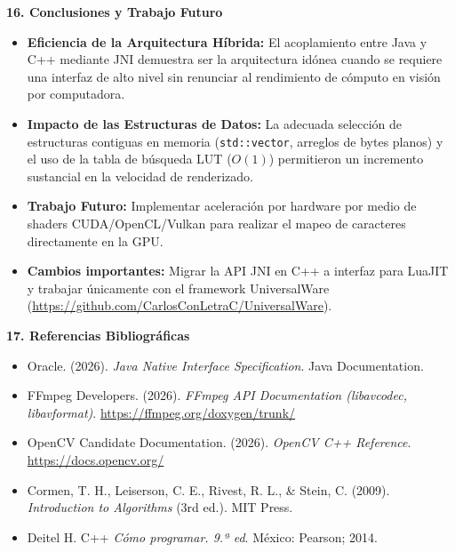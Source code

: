 \documentclass[12pt]{article}
\begin{document}
\newpage

{\Huge \bfseries 16. Conclusiones y Trabajo Futuro}\\[0.8cm]

\Large
\begin{itemize}
    \item \textbf{Eficiencia de la Arquitectura Híbrida:}
    El acoplamiento entre Java y C++ mediante JNI demuestra ser la arquitectura idónea cuando se requiere una interfaz de alto nivel sin renunciar al rendimiento de cómputo en visión por computadora.

    \item \textbf{Impacto de las Estructuras de Datos:}
    La adecuada selección de estructuras contiguas en memoria (\texttt{std::vector}, arreglos de bytes planos) y el uso de la tabla de búsqueda LUT ($O(1)$) permitieron un incremento sustancial en la velocidad de renderizado.

    \item \textbf{Trabajo Futuro:}
    Implementar aceleración por hardware por medio de shaders CUDA/OpenCL/Vulkan para realizar el mapeo de caracteres directamente en la GPU.

    \item \textbf{Cambios importantes:}
    Migrar la API JNI en C++ a interfaz para LuaJIT y trabajar únicamente con el framework UniversalWare (\url{https://github.com/CarlosConLetraC/UniversalWare}).
\end{itemize}

\newpage

{\Huge \bfseries 17. Referencias Bibliográficas}\\[0.8cm]

\Large
\begin{itemize}
    \item Oracle. (2026). \textit{Java Native Interface Specification}. Java Documentation.
    \item FFmpeg Developers. (2026). \textit{FFmpeg API Documentation (libavcodec, libavformat)}. \url{https://ffmpeg.org/doxygen/trunk/}
    \item OpenCV Candidate Documentation. (2026). \textit{OpenCV C++  Reference}. \url{https://docs.opencv.org/}
    \item Cormen, T. H., Leiserson, C. E., Rivest, R. L., \& Stein, C. (2009). \textit{Introduction to Algorithms} (3rd ed.). MIT Press.
    \item  Deitel H. C++ \textit{Cómo programar. 9.ª ed}. México: Pearson; 2014.
\end{itemize}
\end{document}
